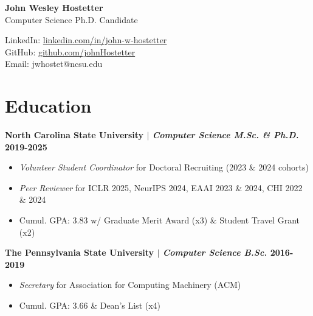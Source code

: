\documentclass[11pt]{article} %
\begin{document}
\begin{center}
	\begin{minipage}{0.5\textwidth}
		{\LARGE\bfseries
			John Wesley Hostetter %
		} \\ \medskip
		Computer Science Ph.D. Candidate %
	\end{minipage} \hfill
	\begin{minipage}{0.475\textwidth}
		\raggedleft
        \small
		LinkedIn: \href{https://www.linkedin.com/in/john-w-hostetter/}{linkedin.com/in/john-w-hostetter} \\
		GitHub: \href{https://github.com/johnHostetter}{github.com/johnHostetter} \\
		Email: jwhostet@ncsu.edu
    \end{minipage}
\end{center}

\vspace{-24pt}



\vspace{-20pt}
\section{Education}
\vspace{-8pt}

\noindent\textbf{North Carolina State University $|$ {\normalfont\itshape Computer Science M.Sc. \& Ph.D.} \hfill 2019-2025}
\vspace{-6pt}
\begin{itemize}
\setlength\itemsep{-0.5em}
    \item \textit{Volunteer Student Coordinator} for Doctoral Recruiting (2023 \& 2024 cohorts)
    \item \textit{Peer Reviewer} for ICLR 2025, NeurIPS 2024, EAAI 2023 \& 2024, CHI 2022 \& 2024
    \item Cumul. GPA: 3.83 w/ Graduate Merit Award (x3) \& Student Travel Grant (x2)
\end{itemize}

\vspace{-4pt}

\noindent\textbf{The Pennsylvania State University $|$ {\normalfont\itshape Computer Science B.Sc.} \hfill 2016-2019}
\vspace{-6pt}
\begin{itemize}
    \setlength\itemsep{-0.5em}
    \item \textit{Secretary} for Association for Computing Machinery (ACM)
    \item Cumul. GPA: 3.66 \& Dean's List (x4)
\end{itemize}
\end{document}
